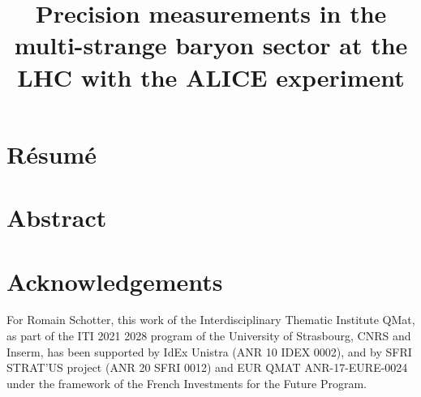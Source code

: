 \documentclass[ALICE,manyauthors]{cernphprep}
\begin{document}
%



\begin{titlepage}

	\title{Precision measurements in the \\multi-strange baryon sector at the LHC with the ALICE experiment}

%

\end{titlepage}
\setcounter{page}{2}


 \newpage \chapter*{Résumé}


 \newpage  %
 \newpage \chapter*{Abstract}



    

 \newpage  %


 \newpage \chapter*{Acknowledgements}


For Romain Schotter, this work of the Interdisciplinary Thematic Institute QMat, as part of the ITI 2021 2028
program of the University of Strasbourg, CNRS and Inserm, has been supported by IdEx Unistra
(ANR 10 IDEX 0002), and by SFRI STRAT’US project (ANR 20 SFRI 0012) and EUR
QMAT ANR-17-EURE-0024 under the framework of the French Investments for the Future
Program.
 \newpage 
\end{document}
